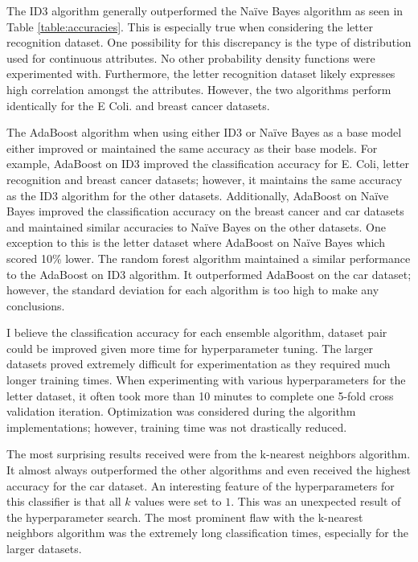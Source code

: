 \documentclass[11pt]{article}
\begin{document}
The ID3 algorithm generally outperformed the Naïve Bayes algorithm as seen in Table \ref{table:accuracies}. This is especially true when considering the letter recognition dataset. One possibility for this discrepancy is the type of distribution used for continuous attributes. No other probability density functions were experimented with. Furthermore, the letter recognition dataset likely expresses high correlation amongst the attributes. However, the two algorithms perform identically for the E Coli. and breast cancer datasets.

The AdaBoost algorithm when using either ID3 or Naïve Bayes as a base model either improved or maintained the same accuracy as their base models. For example, AdaBoost on ID3 improved the classification accuracy for E. Coli, letter recognition and breast cancer datasets; however, it maintains the same accuracy as the ID3 algorithm for the other datasets. Additionally, AdaBoost on Naïve Bayes improved the classification accuracy on the breast cancer and car datasets and maintained similar accuracies to Naïve Bayes on the other datasets. One exception to this is the letter dataset where AdaBoost on Naïve Bayes which scored 10\% lower. The random forest algorithm maintained a similar performance to the AdaBoost on ID3 algorithm. It outperformed AdaBoost on the car dataset; however, the standard deviation for each algorithm is too high to make any conclusions.

I believe the classification accuracy for each ensemble algorithm, dataset pair could be improved given more time for hyperparameter tuning. The larger datasets proved extremely difficult for experimentation as they required much longer training times. When experimenting with various hyperparameters for the letter dataset, it often took more than 10 minutes to complete one 5-fold cross validation iteration. Optimization was considered during the algorithm implementations; however, training time was not drastically reduced.

The most surprising results received were from the k-nearest neighbors algorithm. It almost always outperformed the other algorithms and even received the highest accuracy for the car dataset. An interesting feature of the hyperparameters for this classifier is that all $k$ values were set to $1$. This was an unexpected result of the hyperparameter search. The most prominent flaw with the k-nearest neighbors algorithm was the extremely long classification times, especially for the larger datasets.



\end{document}
